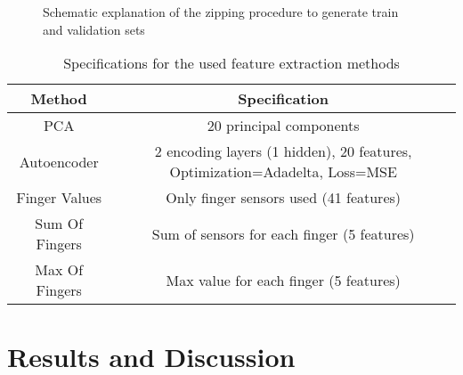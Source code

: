 \begin{figure}[h]
	\caption{Schematic explanation of the zipping procedure to generate train and validation sets}
	\label{zip}
\end{figure}

\begin{table}[H]
\centering
\begin{tabular}{|c|c|}
\hline
Method & Specification \\
\hline\hline
PCA & 20 principal components \\
Autoencoder & 2 encoding layers (1 hidden), 20 features, Optimization=Adadelta, Loss=MSE\\
Finger Values & Only finger sensors used (41 features) \\
Sum Of Fingers & Sum of sensors for each finger (5 features) \\
Max Of Fingers & Max value for each finger (5 features) \\
\hline
\end{tabular}
\caption{Specifications for the used feature extraction methods}
\label{FE}
\end{table} 
\section{Results and Discussion} \label{results}
